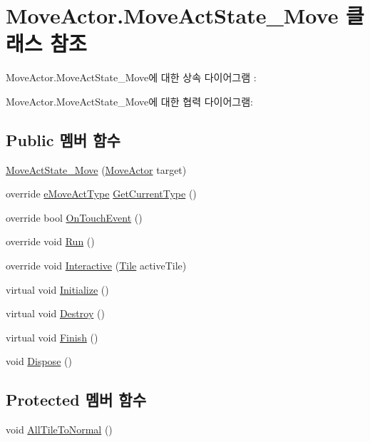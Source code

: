 \hypertarget{class_move_actor_1_1_move_act_state___move}{}\section{Move\+Actor.\+Move\+Act\+State\+\_\+\+Move 클래스 참조}
\label{class_move_actor_1_1_move_act_state___move}


Move\+Actor.\+Move\+Act\+State\+\_\+\+Move에 대한 상속 다이어그램 \+: 


Move\+Actor.\+Move\+Act\+State\+\_\+\+Move에 대한 협력 다이어그램\+:
\subsection*{Public 멤버 함수}
\begin{DoxyCompactItemize}
\item 
\hyperlink{class_move_actor_1_1_move_act_state___move_a6ddbd333a6e1257b76f216b0ce0aa346}{Move\+Act\+State\+\_\+\+Move} (\hyperlink{class_move_actor}{Move\+Actor} target)
\item 
override \hyperlink{_move_actor_8cs_a1df5a2532cc7e6bde40a57d2dcbe23fe}{e\+Move\+Act\+Type} \hyperlink{class_move_actor_1_1_move_act_state___move_a73427cca28d6ef331ac92a94cc68a4d7}{Get\+Current\+Type} ()
\item 
override bool \hyperlink{class_move_actor_1_1_move_act_state___move_a1479015d5a3fde396b2c480bfb1bcffb}{On\+Touch\+Event} ()
\item 
override void \hyperlink{class_move_actor_1_1_move_act_state___move_a8eb57e77a4d5d6e1e0b2f6ccf8532d73}{Run} ()
\item 
override void \hyperlink{class_move_actor_1_1_move_act_state___move_a82e0eb4bd7a3e7eae9bbe9897d75a516}{Interactive} (\hyperlink{class_tile}{Tile} active\+Tile)
\item 
virtual void \hyperlink{class_m_c_n_1_1_state_a8eabaffe047e6dccd5c5d8aed7bf218a}{Initialize} ()
\item 
virtual void \hyperlink{class_m_c_n_1_1_state_a32af22a6a0a979d3b3a80225426aa839}{Destroy} ()
\item 
virtual void \hyperlink{class_m_c_n_1_1_state_a6de4f94b23916fcd05f589759da9ac3f}{Finish} ()
\item 
void \hyperlink{class_m_c_n_1_1_state_a6c53b2eda47e718ff469fd76a95cf02a}{Dispose} ()
\end{DoxyCompactItemize}
\subsection*{Protected 멤버 함수}
\begin{DoxyCompactItemize}
\item 
void \hyperlink{class_move_actor_1_1_move_act_state_a8e1d5e7942d4f9de8c8e0732964c554b}{All\+Tile\+To\+Normal} ()
\end{DoxyCompactItemize}
